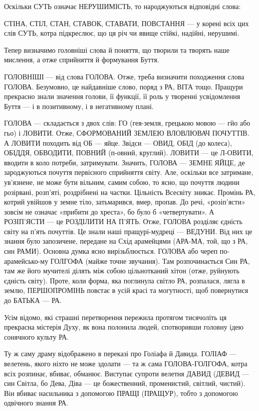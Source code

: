 Оскільки СУТЬ означає НЕРУШИМІСТЬ, то народжуються відповідні слова:

СТІНА, СТІЛ, СТАН, СТАВОК, СТАВАТИ, ПОВСТАННЯ — у корені всіх цих слів СУТЬ,
котра підкреслює, що ця річ чи явище стійкі, надійні, нерушимі.

Тепер визначимо головніші слова й поняття, що творили та творять наше мислення,
а отже сприйняття й формування Буття.

ГОЛОВНІШІ — від слова ГОЛОВА. Отже, треба визначити походження слова ГОЛОВА.
Безумовно, це найдавніше слово, поряд з РА, ВІТА тощо. Пращури прекрасно знали
значення голови, її функції, її роль у творенні усвідомлення Буття — і в
позитивному, і в негативному плані.

ГОЛОВА — складається з двох слів: ГО (гея-земля, грецькою мовою — гйо або гьо)
і ЛОВИТИ. Отже, СФОРМОВАНИЙ ЗЕМЛЕЮ ВЛОВЛЮВАЧ ПОЧУТТІВ. А ЛОВИТИ походить від ОБ
— яйце. Звідси — ОВИД, ОБІД (до колеса), ОБІДДЯ, ОБВОДИТИ, ПОВНИЙ (п-овний,
круглий). ЛОВИТИ — це Л-ОВИТИ, вводити в коло потреби, затримувати. Значить,
ГОЛОВА — ЗЕМНЕ ЯЙЦЕ, де зароджуються почуття первісного сприйняття світу. Але,
оскільки все затримане, ув’язнене, не може бути вільним, самим собою, то ясно,
що почуття людини розірвані, розп’яті, роздрібнені на частки. Цільність
Всесвіту зникає. Промінь РА, котрий увійшов у земне тіло, затьмарився, вмер,
пропав. До речі, «розіп’ясти» зовсім не означає «прибити до хреста», бо було б
«четвертувати». А РОЗІП’ЯСТИ — це РОЗДІЛИТИ НА П’ЯТЬ. Отже, ГОЛОВА розділяє
єдність світу на п’ять почуттів. Це знали наші пращурі-мудреці — ВЕДУНИ. Від
них це знання було запозичене, передане на Схід арамейцями (АРА-МА, той, що з
РА, син РАМИ). Основна думка ясно вирізьблюється. ГОЛОВА або череп
по-арамейсько-му ГОЛГОФА (майже точне звучання). Там розпочинається Син РА, там
же його мучителі ділять між собою цільнотканий хітон (отже, руйнують єдність
світу). Проте, коли форма, яка поглинула світло РА, розпалася, лягла в землю,
ПЕРШОПРОМІНЬ повстає в усій красі та могутності, щоб повернутися до БАТЬКА —
РА.

Усім відомо, які страшні перетворення пережила протягом тисячоліть ця прекрасна
містерія Духу, як вона полонила людей, спотворивши головну ідею сонячного
культу РА.

Ту ж саму драму відображено в переказі про Голіафа й Давида. ГОЛІАФ — велетень,
якого ніхто не може здолати — та ж сама ГОЛОВА-ГОЛГОФА, котра всіх розпинає,
вбиває, обманює. Виступає супроти велетня ДАВИД (ДЕВИД — син Світла, бо Дева,
Діва — це божественний, променистий, світлий, чистий). Він вбиває насильника з
допомогою ПРАЩІ (ПРАЩУР), тобто з допомогою одвічного знання РА.

